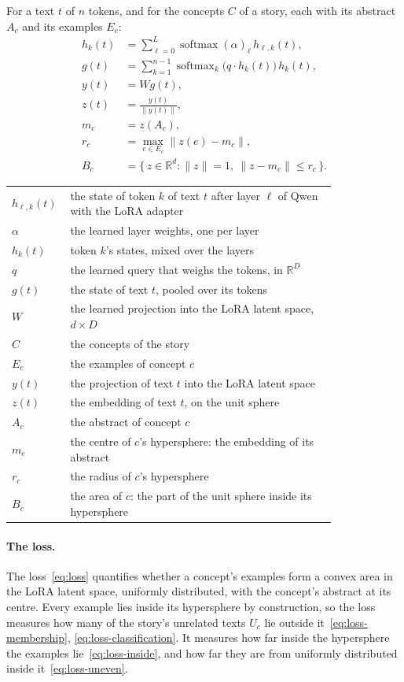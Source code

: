 \documentclass[11pt]{article}
\makeatletter
\theoremstyle{remark}
\DeclareMathOperator{\softmax}{softmax}
\newcommand{\R}{\mathbb{R}}
\newenvironment{symbols}
  {\par\smallskip\noindent\small\begin{tabular}{@{}>{$}l<{$}@{\quad}p{0.82\linewidth}@{}}}
  {\end{tabular}\par\medskip}
\makeatother
\begin{document}
For a text $t$ of $n$ tokens, and for the concepts $C$ of a story, each with its abstract $A_c$ and its examples $E_c$:
\begin{align}
h_k(t) &= \sum_{\ell=0}^{L} \softmax(\alpha)_\ell \, h_{\ell,k}(t), \label{eq:loss-layers} \\
g(t) &= \sum_{k=1}^{n-1} \softmax_k\bigl(q \cdot h_k(t)\bigr) \, h_k(t), \label{eq:loss-tokens} \\
y(t) &= W g(t), \label{eq:loss-projection} \\
z(t) &= \frac{y(t)}{\|y(t)\|}, \label{eq:loss-point} \\
m_c &= z(A_c), \label{eq:loss-centre} \\
r_c &= \max_{e \in E_c} \|z(e) - m_c\|, \label{eq:loss-radius} \\
B_c &= \{\, z \in \R^d : \|z\| = 1,\ \|z - m_c\| \le r_c \,\}. \label{eq:loss-area}
\end{align}
\begin{symbols}
h_{\ell,k}(t) & the state of token $k$ of text $t$ after layer $\ell$ of Qwen with the LoRA adapter \\
\alpha & the learned layer weights, one per layer \\
h_k(t) & token $k$'s states, mixed over the layers \\
q & the learned query that weighs the tokens, in $\R^D$ \\
g(t) & the state of text $t$, pooled over its tokens \\
W & the learned projection into the LoRA latent space, $d \times D$ \\
C & the concepts of the story \\
E_c & the examples of concept $c$ \\
y(t) & the projection of text $t$ into the LoRA latent space \\
z(t) & the embedding of text $t$, on the unit sphere \\
A_c & the abstract of concept $c$ \\
m_c & the centre of $c$'s hypersphere: the embedding of its abstract \\
r_c & the radius of $c$'s hypersphere \\
B_c & the area of $c$: the part of the unit sphere inside its hypersphere \\
\end{symbols}

\paragraph{The loss.} The loss~\eqref{eq:loss} quantifies whether a concept's examples form a convex area in the LoRA latent space, uniformly distributed, with the concept's abstract at its centre. Every example lies inside its hypersphere by construction, so the loss measures how many of the story's unrelated texts $U_c$ lie outside it~\eqref{eq:loss-membership}, \eqref{eq:loss-classification}. It measures how far inside the hypersphere the examples lie~\eqref{eq:loss-inside}, and how far they are from uniformly distributed inside it~\eqref{eq:loss-uneven}.
\end{document}
